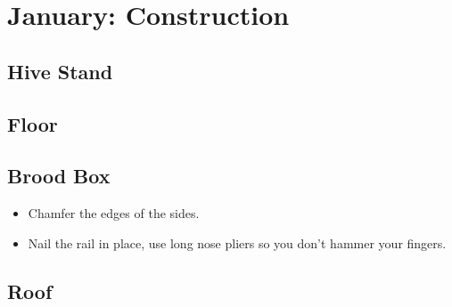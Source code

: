 \section{January: Construction}

\subsection*{Hive Stand}

\subsection*{Floor}

\subsection*{Brood Box}

\begin{itemize}
    \item Chamfer the edges of the sides.
    \item Nail the rail in place, use long nose pliers so you don't hammer your fingers.
\end{itemize}

\subsection*{Roof}